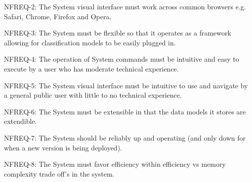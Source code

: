 \documentclass[11pt]{report}
\begin{document}
NFREQ-2: The System visual interface must work across common browsers e.g. Safari, Chrome, Firefox and Opera.

NFREQ-3: The System must be flexible so that it operates as a framework allowing for classification models to be easily plugged in.

NFREQ-4: The operation of System commands must be intuitive and easy to execute by a user who has moderate technical experience.

NFREQ-5: The System visual interface must be intuitive to use and navigate by a general public user with little to no technical experience.

NFREQ-6: The System must be extensible in that the data models it stores are extendible.

NFREQ-7: The System should be reliably up and operating (and only down for when a new version is being deployed).

NFREQ-8: The System must favor efficiency within efficiency vs memory complexity trade off’s in the system.
\end{document}
